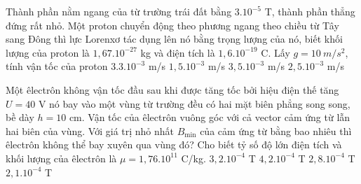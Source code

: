\begin{vidu} %
	Thành phần nằm ngang của từ trường trái đất bằng $3.{10^{- 5}}$ T, thành phần thẳng đứng rất nhỏ. Một proton chuyển động theo phương ngang theo chiều từ Tây sang Đông thì lực Lorenxơ tác dụng lên nó bằng trọng lượng của nó, biết khối lượng của proton là $1,67.{10^{- 27}}$ kg và điện tích là $1,6.{10^{- 19}}$ C. Lấy $g = 10\ m/s^2$, tính vận tốc của proton
	\choice
	{$3.{3.10^{- 3}}$ m/s}
	{$1,{5.10^{- 3}}$ m/s}
	{\True $3,{5.10^{- 3}}$ m/s}
	{$2,{5.10^{- 3}}$ m/s}
\end{vidu}
\begin{vidu} %
	Một êlectrôn không vận tốc đầu sau khi được tăng tốc bởi hiệu điện thế tăng $U = 40$ V nó bay vào một vùng từ trường đều có hai mặt biên phẳng song song, bề dày $h = 10$ cm. Vận tốc của êlectrôn vuông góc với cả vector cảm ứng từ lẫn hai biên của vùng. Với giá trị nhỏ nhất $B_{\min}$ của cảm ứng từ bằng bao nhiêu thì êlectrôn không thể bay xuyên qua vùng đó? Cho biết tỷ số độ lớn điện tích và khối lượng của êlectrôn là $\mu = 1,76. 10^11$ C/kg.
	\choice
	{$3,2. 10^{-4}$ T}
	{$4,2. 10^{-4}$ T}
	{$2,8. 10^{-4}$ T}
	{\True $2,1. 10^{-4}$ T}
\end{vidu}

